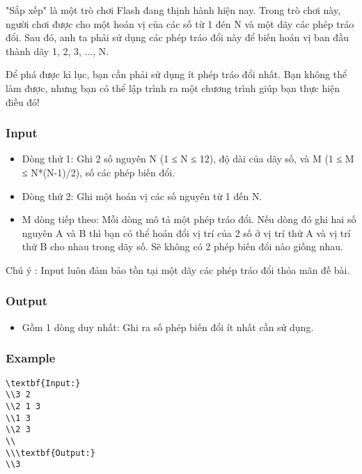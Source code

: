 



   "Sắp xếp" là một trò chơi Flash đang thịnh hành hiện nay. Trong trò chơi này, người chơi được cho một hoán vị của các số từ 1 đén N và một dãy các phép tráo đổi. Sau đó, anh ta phải sử dụng các phép tráo đổi này để biến hoán vị ban đầu thành dãy 1, 2, 3, ..., N.  

   Để phá được kỉ lục, bạn cần phải sử dụng ít phép tráo đổi nhất. Bạn không thể làm được, nhưng bạn có thể lập trình ra một chương trình giúp bạn thực hiện điều đó!  

\subsubsection{   Input  }
\begin{itemize}
	\item     Dòng thứ 1: Ghi 2 số nguyên N (1 ≤ N ≤ 12), độ dài của dãy số, và M (1 ≤ M ≤ N*(N-1)/2), số các phép biến đổi.   
\end{itemize}
\begin{itemize}
	\item     Dòng thứ 2: Ghi một hoán vị các số nguyên từ 1 đến N.   
	\item     M dòng tiếp theo: Mỗi dòng mô tả một phép tráo đổi. Nếu dòng đó ghi hai số nguyên A và B thì bạn có thể hoán đổi vị trí của 2 số ở vị trí thứ A và vị trí thứ B cho nhau trong dãy số. Sẽ không có 2 phép biến đổi nào giống nhau.   
\end{itemize}

Chú ý   : Input luôn đảm bảo tồn tại một dãy các phép tráo đổi thỏa mãn đề bài.  

\subsubsection{   Output  }
\begin{itemize}
	\item     Gồm 1 dòng duy nhất: Ghi ra số phép biến đổi ít nhất cần sử dụng.   
\end{itemize}

\subsubsection{   Example  }
\begin{verbatim}
\textbf{Input:}
\\3 2
\\2 1 3
\\1 3
\\2 3
\\
\\\textbf{Output:}
\\3\end{verbatim}

